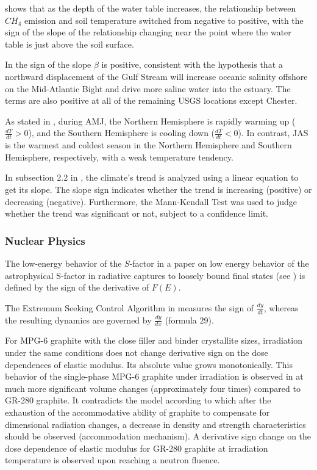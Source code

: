 \documentclass[11pt]{book}
\begin{document}
\cite{mcewing2015environmental} shows that as the depth of the water table
increases, the relationship between $CH_{4}$ emission and soil temperature
switched from negative to positive, with the sign of the slope of
the relationship changing near the point where the water table is
just above the soil surface.

In \cite{ross2015sea} the sign of the slope $\beta$ is positive,
consistent with the hypothesis that a northward displacement of the
Gulf Stream will increase oceanic salinity offshore on the Mid-Atlantic
Bight and drive more saline water into the estuary. The terms are
also positive at all of the remaining USGS locations except Chester.

As stated in \cite{song2018seasonally}, during AMJ, the Northern
Hemisphere is rapidly warming up ($\frac{dT}{dt}>0$), and the Southern
Hemisphere is cooling down ($\frac{dT}{dt}<0$). In contrast, JAS
is the warmest and coldest season in the Northern Hemisphere and Southern
Hemisphere, respectively, with a weak temperature tendency.

In subsection 2.2 in \cite{setiawan2021climate}, the climate's trend
is analyzed using a linear equation to get its slope. The slope sign
indicates whether the trend is increasing (positive) or decreasing
(negative). Furthermore, the Mann-Kendall Test was used to judge whether
the trend was significant or not, subject to a confidence limit.


\subsubsection{Nuclear Physics}

The low-energy behavior of the $S$-factor in a paper on low energy behavior of the astrophysical S-factor
in radiative captures to loosely bound final states (see \cite{mukhamedzhanov2002low})
is defined by the sign of the derivative of $F\left(E\right)$.

The Extremum Seeking Control Algorithm in \cite{agarwal2016integration}
measures the sign of $\frac{dy}{dt}$, whereas the resulting dynamics
are governed by $\frac{dy}{dx}$ (formula 29).

For MPG-6 graphite with the close filler and binder crystallite sizes,
irradiation under the same conditions does not change derivative sign
on the dose dependences of elastic modulus. Its absolute value grows
monotonically. This behavior of the \textquotedbl single-phase\textquotedbl{}
MPG-6 graphite under irradiation is observed in \cite{gurovich2019radiation}
at much more significant volume changes (approximately four times)
compared to GR-280 graphite. It contradicts the model according to
which after the exhaustion of the accommodative ability of graphite
to compensate for dimensional radiation changes, a decrease in density
and strength characteristics should be observed (accommodation mechanism).
A derivative sign change on the dose dependence of elastic modulus
for GR-280 graphite at irradiation temperature is observed upon reaching
a neutron fluence.
\end{document}
